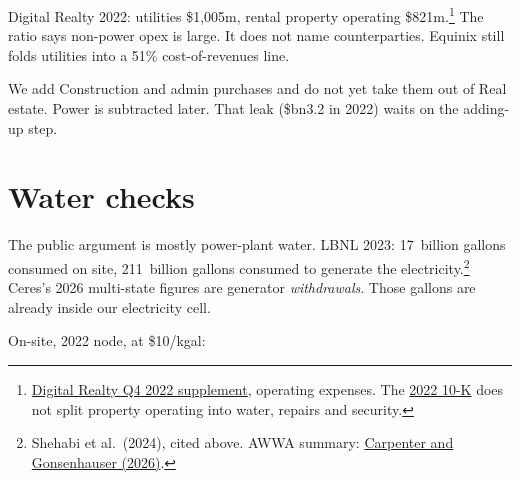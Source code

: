 \documentclass[11pt]{article}
\newcommand{\bn}{\$bn}
\begin{document}
Digital Realty 2022: utilities \$1{,}005m, rental property operating \$821m.\footnote{\href{https://www.sec.gov/Archives/edgar/data/1297996/000155837023001449/dlr-20230216xex99d1.htm}{Digital Realty Q4 2022 supplement}, operating expenses. The \href{https://www.sec.gov/Archives/edgar/data/1297996/000155837023002087/dlr-20221231x10k.htm}{2022 10-K} does not split property operating into water, repairs and security.} The ratio says non-power opex is large. It does not name counterparties. Equinix still folds utilities into a 51\% cost-of-revenues line.

We add Construction and admin purchases and do not yet take them out of Real estate. Power is subtracted later. That leak (\bn3.2 in 2022) waits on the adding-up step.

\section{Water checks}
\label{sec:water}

The public argument is mostly power-plant water. LBNL 2023: 17~billion gallons consumed on site, 211~billion gallons consumed to generate the electricity.\footnote{Shehabi et al.\ (2024), cited above. AWWA summary: \href{https://doi.org/10.1002/awwa.2515}{Carpenter and Gonsenhauser (2026)}.} Ceres's 2026 multi-state figures are generator \emph{withdrawals}. Those gallons are already inside our electricity cell.

On-site, 2022 node, at \$10/kgal:
\end{document}
